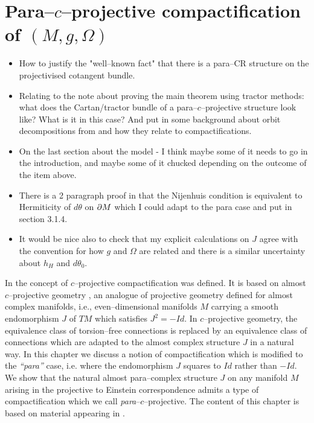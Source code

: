 



\chapter{Para--$c$--projective compactification of $(M,g,\Omega)$} \label{chap:c-proj}

\begin{itemize}
\item How to justify the "well--known fact" that there is a para--CR structure on the projectivised cotangent bundle.
\item Relating to the note about proving the main theorem using tractor methods: what does the Cartan/tractor bundle of a para--$c$--projective structure look like? What is it in this case? And put in some background about orbit decompositions from \cite{CGH-duke} and how they relate to compactifications.
\item On the last section about the model - I think maybe some of it needs to go in the introduction, and maybe some of it chucked depending on the outcome of the item above.
\item There is a 2 paragraph proof in \cite{CG} that the Nijenhuis condition is equivalent to Hermiticity of $d\theta$ on $\partial M$ which I could adapt to the para case and put in section 3.1.4.
\item It would be nice also to check that my explicit calculations on $J$ agree with the convention for how $g$ and $\Omega$ are related and there is a similar uncertainty about $h_H $ and $d\theta_0$.
\end{itemize}

In \cite{CG} the concept of $c$--projective compactification was
defined. It is based on almost $c$--projective geometry \cite{c_proj},
an analogue of projective geometry defined for almost complex
manifolds, i.e., even--dimensional manifolds $M$ carrying a smooth endomorphism $J$ of $TM$ which satisfies $J^2=-Id$. In $c$--projective geometry, the equivalence class of torsion--free connections is replaced by an equivalence class of connections which are adapted to the almost complex structure $J$ in a natural way. In this chapter we discuss a notion of compactification which is modified to the {\it{``para''}} case, i.e. where the endomorphism $J$ squares to $Id$ rather than $-Id$. We show that the natural almost para--complex structure $J$ on any manifold $M$ arising in the projective to Einstein correspondence admits a type of compactification which we call \textit{para}--$c$--projective. The content of this chapter is based on material appearing in \cite{DGW}.


